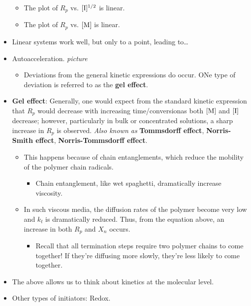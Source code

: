 \documentclass[../notes.tex]{subfiles}
\begin{document}
\begin{itemize}
    \begin{itemize}
        \item The plot of $R_p$ vs. $[\ce{I}]^{1/2}$ is linear.
        \item The plot of $R_p$ vs. $[\ce{M}]$ is linear.
    \end{itemize}
    \item Linear systems work well, but only to a point, leading to\dots
    \item Autoacceleration.
    \emph{picture}
    \begin{itemize}
        \item Deviations from the general kinetic expressions do occur. ONe type of deviation is referred to as the \textbf{gel effect}.
    \end{itemize}
    \item \textbf{Gel effect}: Generally, one would expect from the standard kinetic expression that $R_p$ would decrease with increasing time/conversionas both $[\ce{M}]$ and $[\ce{I}]$ decrease; however, particularly in bulk or concentrated solutions, a sharp increase in $R_p$ is observed. \emph{Also known as} \textbf{Tommsdorff effect}, \textbf{Norris-Smith effect}, \textbf{Norris-Tommsdorff effect}.
    \begin{itemize}
        \item This happens because of chain entanglements, which reduce the mobility of the polymer chain radicals.
        \begin{itemize}
            \item Chain entanglement, like wet spaghetti, dramatically increase viscosity.
        \end{itemize}
        \item In such viscous media, the diffusion rates of the polymer become very low and $k_t$ is dramatically reduced. Thus, from the equation above, an increase in both $R_p$ and $X_n$ occurs.
        \begin{itemize}
            \item Recall that all termination steps require two polymer chains to come together! If they're diffusing more slowly, they're less likely to come together.
        \end{itemize}
    \end{itemize}
    \item The above allows us to think about kinetics at the molecular level.
    \item Other types of initiators: Redox.
    \begin{itemize}

\end{itemize}
\end{itemize}
\end{document}
